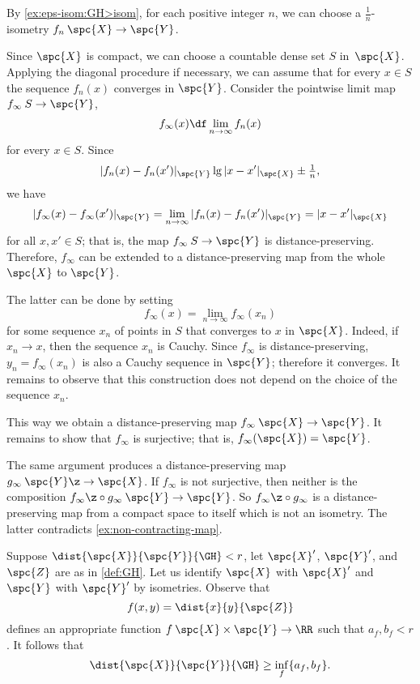 By \ref{ex:eps-isom:GH>isom}, for each positive integer $n$, we can choose a $\tfrac1n$-isometry $f_n\:\spc{X}\to\spc{Y}$.

Since $\spc{X}$ is compact, 
we can choose a countable dense set
$S$ in~$\spc{X}$.
Applying the diagonal procedure if necessary, we can assume that for every $x \in S$ the sequence $f_n(x)$ 
converges in $\spc{Y}$. 
Consider the pointwise limit map  $f_\infty \: S \to \spc{Y}$,
 $$f_\infty(x) \df \lim_{n\to\infty} f_n (x)$$ for every $x \in S$. 
Since $$|f_n (x)- f_n (x')|_{\spc{Y}}\lg |x- x'|_\spc{X} \pm\tfrac1n,$$ 
we have 
$$|f_\infty(x)-f_\infty (x')|_{\spc{Y}} 
= \lim_{n\to\infty} |f_n(x)-f_n (x')|_{\spc{Y}} 
= |x -x'|_\spc{X}$$ for all
$x, x' \in S$; 
that is, the map $f_\infty\:S\to \spc{Y}$ is distance-preserving. 
Therefore, $f_\infty$ can be extended to a distance-preserving map from the whole $\spc{X}$ to $\spc{Y}$.

The latter can be done by setting 
$$f_\infty(x)=\lim_{n\to\infty} f_\infty(x_n)$$ 
for some sequence $x_n$ of points  in $S$
that converges to $x$ in $\spc{X}$.
Indeed, if $x_n\to x$, then the sequence $x_n$ is Cauchy.
Since $f_\infty$ is distance-preserving, $y_n=f_\infty(x_n)$ is also a Cauchy sequence in $\spc{Y}$;
therefore it converges.
It remains to observe that this construction does not depend on the choice of the sequence $x_n$.

This way we obtain a distance-preserving map $f_\infty\:\spc{X}\to \spc{Y}$. 
It remains to show that $f_\infty$ is surjective; that is, $f_\infty(\spc{X})=\spc{Y}$.

The same argument produces a distance-preserving map $g_\infty\:\spc{Y}\z\to \spc{X}$.
If $f_\infty$ is not surjective, then neither is the composition $f_\infty\z\circ g_\infty\:\spc{Y}\to \spc{Y}$.
So $f_\infty \z\circ g_\infty$ is a distance-preserving map from a compact space to itself which is not an isometry.
The latter contradicts \ref{ex:non-contracting-map}. 
\qeds
















Suppose $\dist{\spc{X}}{\spc{Y}}{\GH}<r$, let $\spc{X}'$, $\spc{Y}'$, and $\spc{Z}$ are as in \ref{def:GH}.
Let us identify $\spc{X}$ with $\spc{X}'$ and  $\spc{Y}$ with $\spc{Y}'$ by isometries.
Observe that  
\[f(x,y)=\dist{x}{y}{\spc{Z}}\]
defines an appropriate function $f\:\spc{X}\times\spc{Y}\to\RR$ such that 
$a_f,b_f<r$.
It follows that 
\[\dist{\spc{X}}{\spc{Y}}{\GH}\ge\inf_f\{a_f,b_f\}.\]

